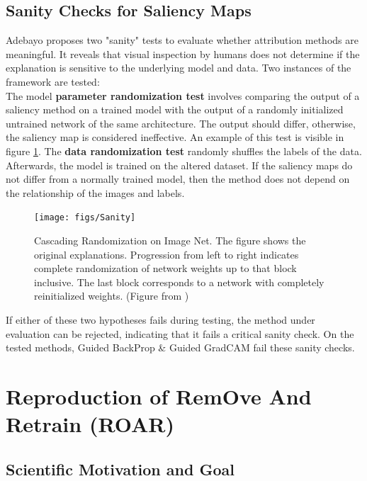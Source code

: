 \section{Sanity Checks for Saliency Maps}

Adebayo \cite{adebayo2020sanity} proposes two "sanity" tests to evaluate whether attribution methods are meaningful. It reveals that visual inspection by humans does not determine if the explanation is sensitive to the underlying model and data. Two instances of the framework are tested:
\\
The model \textbf{parameter randomization test} involves comparing the output of a saliency method on a trained model with the output of a randomly initialized untrained network of the same architecture. The output should differ, otherwise, the saliency map is considered ineffective. An example of this test is visible in figure \ref{fig:Sanity}. The \textbf{data randomization test} randomly shuffles the labels of the data. Afterwards, the model is trained on the altered dataset. If the saliency maps do not differ from a normally trained model, then the method does not depend on the relationship of the images and labels.\\
\begin{figure}[H]
	\centering
	\texttt{[image: figs/Sanity]}
	\caption[Cascading Randomization on Image Net]{Cascading Randomization on Image Net. The figure shows the original explanations. Progression from left to right indicates complete randomization of network weights up to that block inclusive. The last block corresponds to a network with completely reinitialized weights. (Figure from \cite{adebayo2020sanity})}
	\label{fig:Sanity}
\end{figure}
If either of these two hypotheses fails during testing, the method under evaluation can be rejected, indicating that it fails a critical sanity check. On the tested methods, Guided BackProp \& Guided GradCAM fail these sanity checks.



\chapter{Reproduction of RemOve And Retrain (ROAR)} %
\label{sec:project}

\section{Scientific Motivation and Goal}

